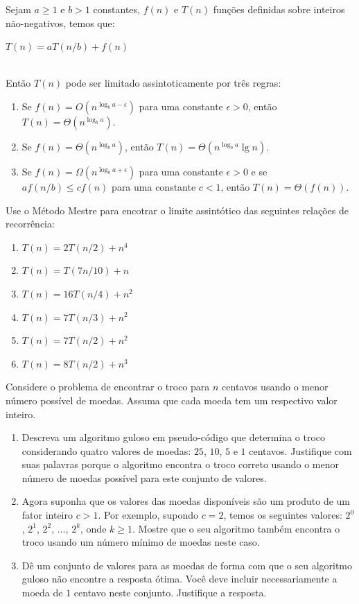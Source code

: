 \documentclass[12pt,a4paper]{article}
\begin{document}
\begin{question}[points=3.0,subtitle=Divisão-e-conquista]
	Sejam $a \geq 1$ e $b > 1$ constantes, $f(n)$ e $T(n)$ funções definidas
	sobre inteiros não-negativos, temos que:
	\begin{table}[h!]
		\centering
		$T(n) = aT(n/b) + f(n)$
	\end{table}
	\\
	Então $T(n)$ pode ser limitado assintoticamente por três regras:
	\begin{enumerate}
		\item Se $f(n) = O(n^{\log_b{a-\epsilon}})$ para uma constante $\epsilon > 0$, então $T(n)=\Theta(n^{\log_b{a}})$.
		\item Se $f(n) = \Theta(n^{\log_b{a}})$, então $T(n)=\Theta(n^{\log_b{a}}\lg n)$.
		\item Se $f(n) = \Omega(n^{\log_b{a} + \epsilon})$ para uma constante $\epsilon > 0$ e se $af(n/b) \leq cf(n)$ para uma constante $c<1$, então $T(n) = \Theta(f(n))$.
	\end{enumerate}
	Use o Método Mestre para encotrar o limite assintótico das seguintes relações de recorrência:
	\begin{multicols}{2}
		\begin{enumerate}[label=(\alph*)]
		\item $T(n)=2T(n/2)+n^4$
		\item $T(n)=T(7n/10)+n$
		\item $T(n)=16T(n/4)+n^2$
		\item $T(n)=7T(n/3)+n^2$
		\item $T(n)=7T(n/2)+n^2$
		\item $T(n)=8T(n/2)+n^3$
		\end{enumerate}
	\end{multicols}
\end{question}

\begin{question}[points=2.5, subtitle=Algoritmos Gulosos]
	Considere o problema de encontrar o troco para $n$ centavos usando o menor
	número possível de moedas. Assuma que cada moeda tem um respectivo valor inteiro.
	\begin{enumerate}[label=(\alph*)]
		\item Descreva um algoritmo guloso em pseudo-código que determina o
		troco considerando quatro valores de moedas: $25$, $10$, $5$ e $1$ centavos.
		Justifique com suas palavras porque o algoritmo encontra o troco correto
		usando o menor número de moedas possível para este conjunto de valores.
		\item Agora suponha que os valores das moedas disponíveis são um produto
		de um fator	inteiro $c>1$. Por exemplo, supondo $c=2$, temos os seguintes
		valores: $2^0$, $2^1$, $2^2$, $\ldots$, $2^k$, onde
		$k\geq1$. Mostre que o seu algoritmo também encontra o troco usando um
		número mínimo de moedas neste caso.
		\item Dê um conjunto de valores para as moedas de forma com que o seu 
		algoritmo guloso não encontre a resposta ótima. Você deve incluir necessariamente
		a moeda de $1$ centavo neste conjunto. Justifique a resposta.
	\end{enumerate}
\end{question}
\end{document}
